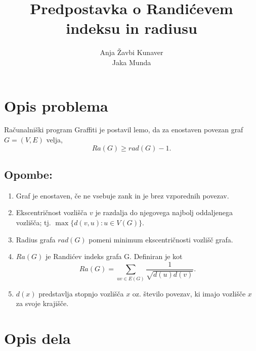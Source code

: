 \documentclass[a4paper, 10pt]{article}
\begin{document}
\title{Predpostavka o Randićevem indeksu in radiusu}
\author{Anja Žavbi Kunaver\\Jaka Munda}

\maketitle

\section{Opis problema}
Računalniški program Graffiti je postavil lemo, da za enostaven povezan graf $G=(V, E)$ velja, $$ Ra(G) \geq rad(G) -1.$$


\subsection*{Opombe:}
\begin{enumerate}
\item Graf je enostaven, če ne vsebuje zank in je brez vzporednih povezav.
\item Ekscentričnost vozlišča $v$ je razdalja do njegovega najbolj oddaljenega vozlišča; tj. $\max \{d(v,u) : u \in V(G) \}$.
\item Radius grafa $rad(G)$ pomeni minimum ekscentričnosti vozlišč grafa.
\item
$Ra(G)$ je Randićev indeks grafa G. Definiran je kot
$$Ra(G) = \sum_{uv \in E(G)} \frac{1}{\sqrt{d(u) d(v)}}.$$
\item $d(x)$ predstavlja stopnjo vozlišča $x$ oz. število povezav, ki imajo vozlišče $x$ za svoje krajišče.
\end{enumerate}


\section{Opis dela}
\end{document}
